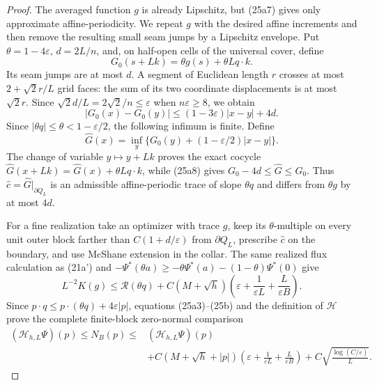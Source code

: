 \documentclass{smfart}
\theoremstyle{definition}
\newcommand{\1}{\mathbf 1}
\begin{document}
\begin{proof}
The averaged function $g$ is already Lipschitz, but (25a7) gives only
approximate affine-periodicity.  We repeat $g$ with the desired affine
increments and then remove the resulting small seam jumps by a Lipschitz
envelope.  Put
$\theta=1-4\varepsilon$, $d=2L/n$, and, on half-open cells of the
universal cover, define
\begin{equation*}
G_ 0(s+Lk)=\theta g(s)+\theta Lq\cdot k.
\end{equation*}
Its seam jumps are at most $d$.  A segment of Euclidean length $r$
crosses at most $2+\sqrt2r/L$ grid faces: the sum of its two coordinate
displacements is at most $\sqrt2r$.  Since
$\sqrt2d/L=2\sqrt2/n\leq\varepsilon$ when $n\varepsilon\geq8$, we obtain
\begin{equation}
|G_ 0(x)-G_ 0(y)|\leq(1-3\varepsilon)|x-y|+4d.
\tag{25a8}
\end{equation}
Since $|\theta q|\leq\theta<1-\varepsilon/2$, the following
infimum is finite.  Define
\begin{equation*}
\widehat G(x)=\inf_ y\{G_ 0(y)+(1-\varepsilon/2)|x-y|\}.
\end{equation*}
The change of variable $y\mapsto y+Lk$ proves the exact cocycle
$\widehat G(x+Lk)=\widehat G(x)+\theta Lq\cdot k$, while (25a8)
gives $G_ 0-4d\leq\widehat G\leq G_ 0$.  Thus
$\widehat c=\widehat G|_ {\partial Q_ L}$ is an admissible
affine-periodic trace of slope $\theta q$ and differs from
$\theta g$ by at most $4d$.

For a fine realization take an optimizer with trace $g$, keep its
$\theta$-multiple on every unit outer block farther than
$C(1+d/\varepsilon)$ from $\partial Q_ L$, prescribe
$\widehat c$ on the boundary, and use McShane extension in the collar.
The same realized flux calculation as (21a') and
$-\Psi^*(\theta a)\geq-\theta\Psi^*(a)
-(1-\theta)\Psi^*(0)$ give
\begin{equation}
L^{-2}K(g)\leq \mathcal R(\theta q)+C(M+\sqrt h)
\left(\varepsilon+\frac1{\varepsilon L}
+\frac L{\varepsilon B}\right).
\tag{25b}
\end{equation}
Since $p\cdot q\leq p\cdot(\theta q)+4\varepsilon|p|$, equations
(25a3)--(25b) and the definition of $\mathcal H$ prove the complete
finite-block zero-normal comparison
\begin{equation}
\boxed{\begin{aligned}
(\mathcal H_ {h,L}\Psi)(p)\leq N_ B(p)
\leq{}&(\mathcal H_ {h,L}\Psi)(p)\\
&+C(M+\sqrt h+|p|)
\left(\varepsilon+\frac1{\varepsilon L}
+\frac L{\varepsilon B}\right)
+C\sqrt{\frac{\log(C/\varepsilon)}L}.
\end{aligned}}
\tag{26}
\end{equation}


\end{proof}
\end{document}
